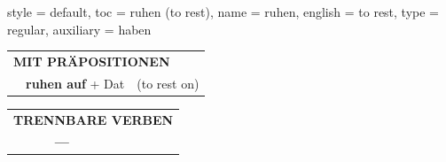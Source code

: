 \begin{verbentry}{
  style = {default},
  toc = {ruhen (to rest)},
  name = {ruhen},
  english = {to rest},
  type = {regular},
  auxiliary = {haben}
}
\vspace{10pt}

\begin{tabular}{lll}
\multicolumn{3}{l}{\textbf{MIT PRÄPOSITIONEN}}\\
& \textbf{ruhen auf} + Dat & (to rest on)\\
\end{tabular}
\hfill
\begin{tabular}{lll}
\multicolumn{3}{l}{\textbf{TRENNBARE VERBEN}}\\
& \textbf{---} & \\
\end{tabular}

\vspace{-5pt}
\end{verbentry}
